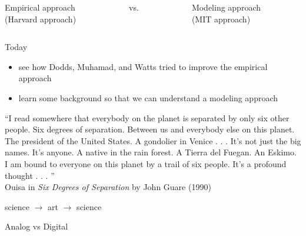 \documentclass[aspectratio=169]{beamer}
\begin{document}
\begin{frame}

\begin{center}
\begin{columns}
\begin{column}{0.4\textwidth}
Empirical approach\\(Harvard approach)
\end{column}
\begin{column}{0.2\textwidth}
vs.
\end{column}
\begin{column}{0.4\textwidth}
Modeling approach\\(MIT approach)
\end{column}
\end{columns}
\end{center}

\pause
\vfill
Today
\begin{itemize}
\item see how Dodds, Muhamad, and Watts tried to improve the empirical approach
\item learn some background so that we can understand a modeling approach
\end{itemize}

\end{frame}
\begin{frame}

``I read somewhere that everybody on the planet is separated by only six other people.  Six degrees of separation.  Between us and everybody else on this planet.  The president of the United States.  A gondolier in Venice . . . It's not just the big names.  It's anyone.  A native in the rain forest.  A Tierra del Fuegan.  An Eskimo.  I am bound to everyone on this planet by a trail of six people.  It's a profound thought . . . ''\\
Ouisa in \textit{Six Degrees of Separation} by John Guare (1990)

\pause
\vfill
science $\rightarrow$ art $\rightarrow$ science
 

\end{frame}
\begin{frame}

{\Large
\begin{center}
Analog vs Digital
\end{center}}

\end{frame}
\end{document}

